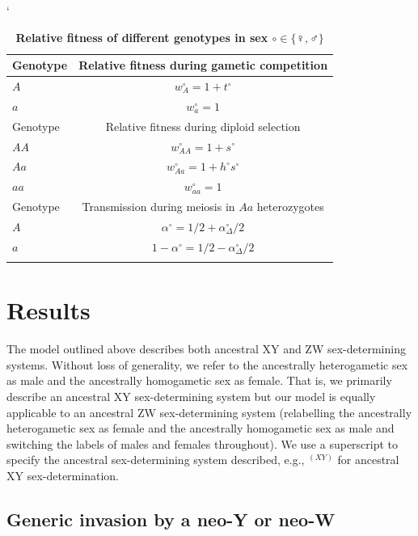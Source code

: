 \documentclass[10pt,letterpaper]{article}
\begin{document}
`
\begin{table}[ht]
\smallskip
\caption{{\bf Relative fitness of different genotypes in sex $\circ \in \{\female,\male\}$ } }
\begin{tabular}{l c }
\hline\hline
  Genotype & Relative fitness during gametic competition \\ [0.5ex] \hline
  $A$ & $w_{A}^\circ = 1+t^\circ$ \\
  $a$ & $w_{a}^\circ = 1$ \\ [0.5ex] \hline
  Genotype & Relative fitness during diploid selection \\ [0.5ex] \hline
  $AA$ & $w_{AA}^\circ = 1+ s^\circ$ \\
  $Aa$ & $w_{Aa}^\circ = 1+h^\circ s^\circ$ \\
  $aa$ & $w_{aa}^\circ = 1$ \\ [0.5ex] \hline
  Genotype & Transmission during meiosis in $Aa$ heterozygotes \\ [0.5ex] \hline
  $A$ & $\alpha^\circ=1/2+\alpha_{\Delta}^{\circ}/2$ \\
  $a$ & $1-\alpha^\circ=1/2-\alpha_{\Delta}^{\circ}/2$ \\
  \hline \hline
  \label{tab:fitnesstable}
 \end{tabular}
\end{table}

\section*{Results}

The model outlined above describes both ancestral XY and ZW sex-determining systems. %
Without loss of generality, we refer to the ancestrally heterogametic sex as male and the ancestrally homogametic sex as female.
That is, we primarily describe an ancestral XY sex-determining system but our model is equally applicable to an ancestral ZW sex-determining system (relabelling the ancestrally heterogametic sex as female and the ancestrally homogametic sex as male and switching the labels of males and females throughout). 
We use a superscript to specify the ancestral sex-determining system described, e.g., $^{(XY)}$ for ancestral XY sex-determination.

\subsection*{Generic invasion by a neo-Y or neo-W}
\end{document}
